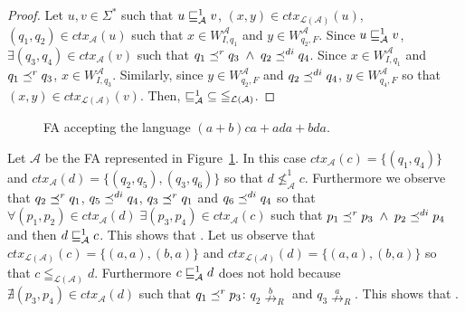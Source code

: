 \begin{proof}
Let $u, v \in \Sigma^*$ such that $u \sqsubseteq^1_{\mathcal{A}} v$,
$(x,y) \in ctx_{ \mathcal{L}( \mathcal{A} ) }(u)$,
$( q_1,q_2) \in ctx_{ \mathcal{A} }(u)$ such that
$x \in W_{I,q_1}^{ \mathcal{A} }$ and $y \in W_{q_2,F}^{ \mathcal{A} }$.
Since $ u \sqsubseteq^1_{\mathcal{A}} v$, $ \exists (q_3,q_4) \in ctx_{ \mathcal{A} }(v)$
such that $q_1 \preceq^r q_3 \;\wedge\; q_2 \preceq^{di} q_4$.
Since $x \in W_{I,q_1}^{ \mathcal{A} }$ and $q_1 \preceq^r q_3$,
$x \in W_{I,q_3}^{ \mathcal{A} }$.
Similarly, since $y \in W_{q_2, F}^{ \mathcal{A} }$ and $q_2 \preceq^{di} q_4$,
$y \in W_{q_4, F}^{ \mathcal{A} }$ so that
$(x,y) \in ctx_{ \mathcal{L}( \mathcal{A}) }(v)$.
Then, $\sqsubseteq^1_{\mathcal{A}} \; \subseteq \; \leqq_{\mathcal{L}(\mathcal{A})}$.
\end{proof}

\begin{figure}[h]
\centering
{}
\caption{FA accepting the language $(a+b)ca + ada + bda$.}
\label{fig:fa1}
\end{figure}

\begin{remark}
Let $\mathcal{A}$ be the FA represented in Figure~\ref{fig:fa1}.
In this case $ctx_{\mathcal{A}}(c) = \{(q_1,q_4)\}$ and $ctx_{\mathcal{A}}(d) = \{(q_2,q_5), (q_3,q_6)\}$
so that $d \nleq^1_{\mathcal{A}} c$.
Furthermore we observe that $q_2 \preceq^r q_1$, $q_5 \preceq^{di} q_4$, $q_3 \preceq^r q_1$ and $q_6 \preceq^{di} q_4$
so that $\forall (p_1,p_2) \in ctx_{\mathcal{A}}(d) \; \exists (p_3,p_4) \in ctx_{\mathcal{A}}(c)$ such that
$p_1 \preceq^r p_3 \;\wedge\; p_2 \preceq^{di} p_4$ and then $d \sqsubseteq^1_{\mathcal{A}} c$.
This shows that .
Let us observe that $ctx_{\mathcal{L}(\mathcal{A})}(c) = \{(a,a), (b,a)\}$ and
$ctx_{\mathcal{L}(\mathcal{A})}(d) = \{(a,a), (b,a)\}$ so that
$c \leqq_{\mathcal{L}(\mathcal{A})} d$.
Furthermore $c \sqsubseteq^1_{\mathcal{A}} d$ does not hold
because $\nexists (p_3,p_4) \in ctx_{\mathcal{A}}(d)$ such that
$q_1 \preceq^r p_3$: $q_2 \overset{b}{\nrightarrow}_R$ and $q_3 \overset{a}{\nrightarrow}_R$.
This shows that .
\end{remark}

